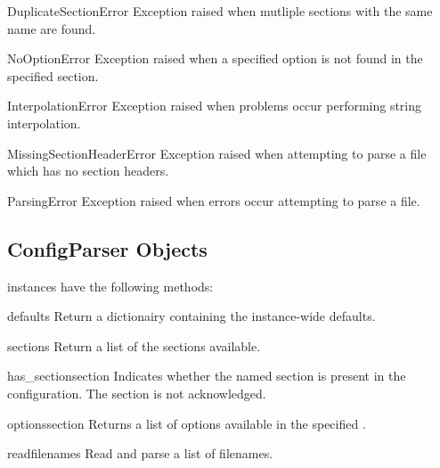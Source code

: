 \begin{excdesc}{DuplicateSectionError}
Exception raised when mutliple sections with the same name are found.
\end{excdesc}

\begin{excdesc}{NoOptionError}
Exception raised when a specified option is not found in the specified 
section.
\end{excdesc}

\begin{excdesc}{InterpolationError}
Exception raised when problems occur performing string interpolation.
\end{excdesc}

\begin{excdesc}{MissingSectionHeaderError}
Exception raised when attempting to parse a file which has no section
headers.
\end{excdesc}

\begin{excdesc}{ParsingError}
Exception raised when errors occur attempting to parse a file.
\end{excdesc}


\subsection{ConfigParser Objects \label{ConfigParser-objects}}

 instances have the following methods:

\begin{methoddesc}{defaults}{}
Return a dictionairy containing the instance-wide defaults.
\end{methoddesc}

\begin{methoddesc}{sections}{}
Return a list of the sections available.
\end{methoddesc}

\begin{methoddesc}{has_section}{section}
Indicates whether the named section is present in the
configuration. The  section is not acknowledged.
\end{methoddesc}

\begin{methoddesc}{options}{section}
Returns a list of options available in the specified .
\end{methoddesc}

\begin{methoddesc}{read}{filenames}
Read and parse a list of filenames.
\end{methoddesc}

